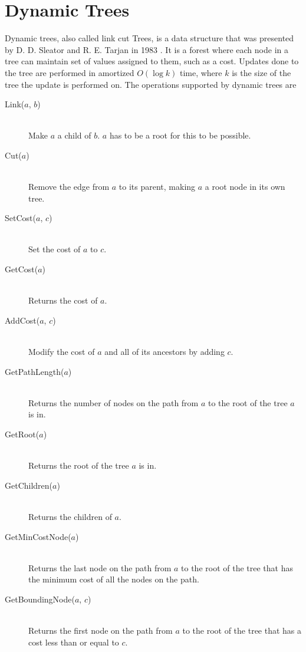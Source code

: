 
\section{Dynamic Trees} \label{Dynamic Trees}

Dynamic trees, also called link cut Trees, is a data structure that was presented by D. D. Sleator and R. E. Tarjan in 1983 \cite{sleator1983}.
It is a forest where each node in a tree can maintain set of values assigned to them, such as a cost.
Updates done to the tree are performed in amortized $O(\log k)$ time, where $k$ is the size of the tree the update is performed on.
The operations supported by dynamic trees are

\begin{description}
  \item[Link($a$, $b$)] \hfill \\
  Make $a$ a child of $b$. $a$ has to be a root for this to be possible.
  \item[Cut($a$)] \hfill \\
  Remove the edge from $a$ to its parent, making $a$ a root node in its own tree.
  \item[SetCost($a$, $c$)] \hfill \\
  Set the cost of $a$ to $c$.
  \item[GetCost($a$)] \hfill \\
  Returns the cost of $a$.
  \item[AddCost($a$, $c$)] \hfill \\
  Modify the cost of $a$ and all of its ancestors by adding $c$.
  \item[GetPathLength($a$)] \hfill \\
  Returns the number of nodes on the path from $a$ to the root of the tree $a$ is in.
  \item[GetRoot($a$)] \hfill \\
  Returns the root of the tree $a$ is in.
  \item[GetChildren($a$)] \hfill \\
  Returns the children of $a$.
  \item[GetMinCostNode($a$)] \hfill \\
  Returns the last node on the path from $a$ to the root of the tree that has the minimum cost of all the nodes on the path.
  \item[GetBoundingNode($a$, $c$)] \hfill \\
  Returns the first node on the path from $a$ to the root of the tree that has a cost less than or equal to $c$.
\end{description}

